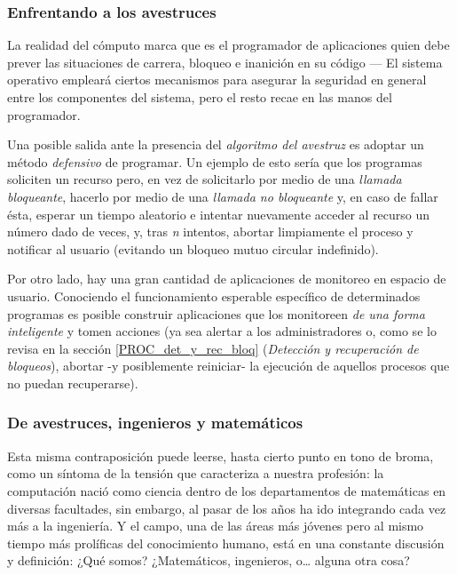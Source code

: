 \documentclass[11pt,fleqn]{book} %
\begin{document}
\subsubsection{Enfrentando a los avestruces}
\label{sec-3-4-4-2}


La realidad del cómputo marca que es el programador de aplicaciones
quien debe prever las situaciones de carrera, bloqueo e inanición en
su código — El sistema operativo empleará ciertos mecanismos para
asegurar la seguridad en general entre los componentes del sistema,
pero el resto recae en las manos del programador.

Una posible salida ante la presencia del \emph{algoritmo del avestruz} es
adoptar un método \emph{defensivo} de programar. Un ejemplo de esto sería
que los programas soliciten un recurso pero, en vez de solicitarlo por
medio de una \emph{llamada bloqueante}, hacerlo por medio de una \emph{llamada no bloqueante} y, en caso de fallar ésta, esperar un tiempo aleatorio
 e intentar nuevamente acceder al recurso un número dado
de veces, y, tras \emph{n} intentos, abortar limpiamente el proceso y
notificar al usuario (evitando un bloqueo mutuo circular indefinido).

Por otro lado, hay una gran cantidad de aplicaciones de monitoreo en
espacio de usuario. Conociendo el funcionamiento esperable específico
de determinados programas es posible construir aplicaciones que los
monitoreen \emph{de una forma inteligente} y tomen acciones (ya sea alertar
a los administradores o, como se lo revisa en la sección
\ref{PROC_det_y_rec_bloq} (\emph{Detección y recuperación de bloqueos}),
abortar -y posiblemente reiniciar- la ejecución de aquellos procesos
que no puedan recuperarse).
\subsubsection{De avestruces, ingenieros y matemáticos}
\label{sec-3-4-4-3}


Esta misma contraposición puede leerse, hasta cierto punto en tono de
broma, como un síntoma de la tensión que caracteriza a nuestra
profesión: la computación nació como ciencia dentro de los
departamentos de matemáticas en diversas facultades, sin embargo, al
pasar de los años ha ido integrando cada vez más a la ingeniería. Y el
campo, una de las áreas más jóvenes pero al mismo tiempo más
prolíficas del conocimiento humano, está en una constante discusión y
definición: ¿Qué somos? ¿Matemáticos, ingenieros, o\ldots{} alguna otra
cosa?
\end{document}
